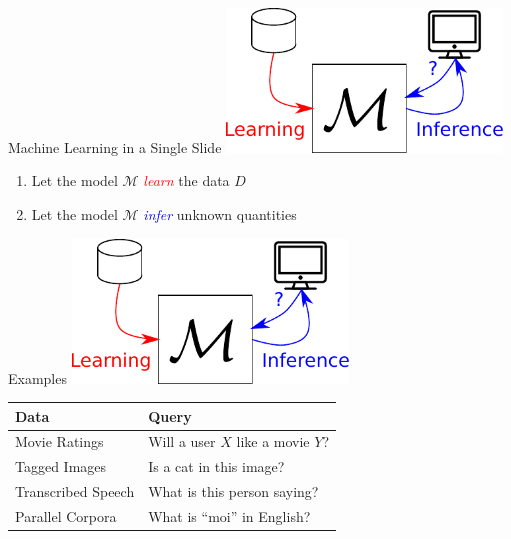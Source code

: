 \documentclass{beamer}
\newcommand{\MM}[0]{\mathcal{M}}
\newcommand{\tred}[1]{\textcolor{red}{#1}}
\newcommand{\tblue}[1]{\textcolor{blue}{#1}}
\begin{document}
\begin{frame}{Machine Learning in a Single Slide}
    \centering
    \includegraphics[width=0.55\textwidth]{machinelearning.pdf}

    \vspace{4mm}
    \raggedright
    \begin{enumerate}
        \item Let the model $\MM$ \tred{\textit{learn}} the data $D$
        \item Let the model $\MM$ \tblue{\textit{infer}} unknown
            quantities
    \end{enumerate}
\end{frame}

\begin{frame}{Examples}
    \centering
    \includegraphics[width=0.55\textwidth]{machinelearning.pdf}

    \vspace{3mm}
    \begin{center}
    { \small
    \begin{tabular}{l | l}
        Data & Query \\
        \hline
        \hline
        Movie Ratings & 
        Will a user $X$ like a movie $Y$? \\
        Tagged Images &
        Is a cat in this image?  \\
        Transcribed Speech &
        What is this person saying?  \\
        Parallel Corpora &
        What is ``moi'' in English?  
    \end{tabular}
    }
\end{center}
\end{frame}
\end{document}
